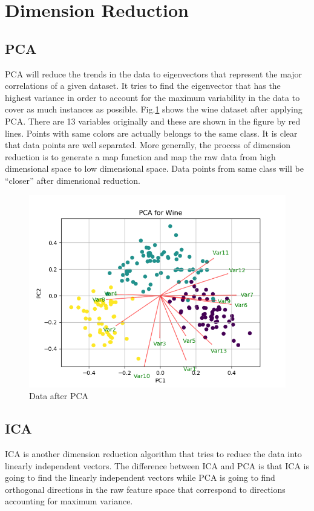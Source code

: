 \documentclass[11pt]{article}
\begin{document}
\section{Dimension Reduction}
\subsection{PCA}
PCA will reduce the trends in the data to eigenvectors that represent the major correlations of a given dataset. It tries to find the eigenvector that has the highest variance in order to account for the maximum variability in the data to cover as much instances as possible. Fig.\ref{Fig:pca_wine} shows the wine dataset after applying PCA. There are 13 variables originally and these are shown in the figure by red lines. Points with same colors are actually belongs to the same class. It is clear that data points are well separated. More generally, the process of dimension reduction is to generate a map function and map the raw data from high dimensional space to low dimensional space. Data points from same class will be ``closer'' after dimensional reduction.
\begin{figure}
 \includegraphics[width=\linewidth]{../figures/pca_wine.png}
 \caption{Data after PCA}
 \label{Fig:pca_wine}
\end{figure}
\subsection{ICA}
ICA is another dimension reduction algorithm that tries to reduce the data into linearly independent vectors. The difference between ICA and PCA is that ICA is going to find the linearly independent vectors while PCA is going to find orthogonal directions in the raw feature space that correspond to directions accounting for maximum variance. 
\end{document}
